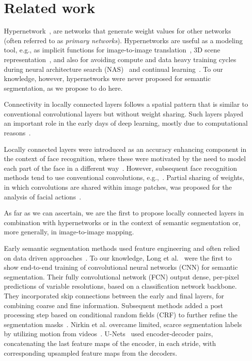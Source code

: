 \documentclass[final]{cvpr}
\newcommand{\minisection}[1]{\vspace{2mm}\noindent{\textbf{#1}.}}
\begin{document}
\section{Related work}
\label{sec:Related work}
Hypernetwork~\cite{ha2016hypernetworks}, are networks that generate weight values for other networks (often referred to as {\em primary networks}). Hypernetworks are useful as a modeling tool, e.g., as implicit functions for image-to-image translation~\cite{de2016dynamic,klocek2019hypernetwork}, 3D scene representation~\cite{littwin2019deep,sitzmann2020implicit}, and also for avoiding compute and data heavy training cycles during neural architecture search (NAS)~\cite{zhang2018graph} and continual learning~\cite{von2019continual}. To our knowledge, however, hypernetworks were never proposed for semantic segmentation, as we propose to do here.


\minisection{Locally connected layers} Connectivity in locally connected layers follows a spatial pattern that is similar to conventional convolutional layers but without weight sharing. Such layers played an important role in the early days of deep learning, mostly due to computational reasons~\cite{dean2012large,raina2009large,uetz2009large}.

Locally connected layers were introduced as an accuracy enhancing component in the context of face recognition, where these were motivated by the need to model each part of the face in a different way~\cite{taigman2014deepface}. However, subsequent face recognition methods tend to use conventional convolutions, e.g.,~\cite{schroff2015facenet}. Partial sharing of weights, in which convolutions are shared within image patches, was proposed for the analysis of facial actions~\cite{zhao2016deep}.

As far as we can ascertain, we are the first to propose locally connected layers in combination with hypernetworks or in the context of semantic segmentation or, more generally, in image-to-image mapping.

\minisection{Semantic segmentation}
Early semantic segmentation methods used feature engineering and often relied on data driven approaches~\cite{hassner2016sifting,hassner2016dense,hassner2012sifts,tau2015dense}.
To our knowledge, Long et al.~\cite{long2015fully} were the first to show end-to-end training of convolutional neural networks (CNN) for semantic segmentation. Their fully convolutional network (FCN) output dense, per-pixel predictions of variable resolutions, based on a classification network backbone. They incorporated skip connections between the early and final layers, for combining coarse and fine information. Subsequent methods added a post processing step based on conditional random fields (CRF) to further refine the segmentation masks~\cite{chen2014semantic,chen2017deeplab,zheng2015conditional}. Nirkin et al. overcame limited, scarce segmentation labels by utilizing motion from videos~\cite{nirkin2018face}. U-Nets~\cite{ronneberger2015u} used encoder-decoder pairs, concatenating the last feature maps of the encoder, in each stride, with corresponding upsampled feature maps from the decoders. 
\end{document}
